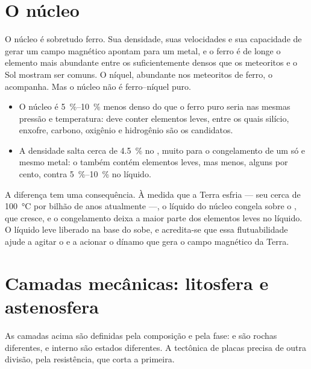 \section{O núcleo}

O núcleo é sobretudo ferro. Sua densidade, suas velocidades e sua capacidade de gerar um campo magnético apontam para um metal, e o ferro é de longe o elemento mais abundante entre os suficientemente densos que os meteoritos e o Sol mostram ser comuns. O níquel, abundante nos meteoritos de ferro, o acompanha. Mas o núcleo não é ferro--níquel puro.
\begin{itemize}
  \item O núcleo é \qtyrange{5}{10}{\percent} menos denso do que o ferro puro seria nas mesmas pressão e temperatura: deve conter elementos leves, entre os quais silício, enxofre, carbono, oxigênio e hidrogênio são os candidatos.
  \item A densidade salta cerca de \qty{4.5}{\percent} no , muito para o congelamento de um só e mesmo metal: o  também contém elementos leves, mas menos, alguns por cento, contra \qtyrange{5}{10}{\percent} no líquido.
\end{itemize}
A diferença tem uma consequência. À medida que a Terra esfria --- seu  cerca de \qty{100}{\degreeCelsius} por bilhão de anos atualmente ---, o líquido do núcleo congela sobre o , que cresce, e
o congelamento deixa a maior parte dos elementos leves no líquido. O líquido leve liberado na base do  sobe, e acredita-se que essa flutuabilidade ajude a agitar o  e a acionar o dínamo que gera o campo magnético da Terra.

\section{Camadas mecânicas: litosfera e astenosfera}

As camadas acima são definidas pela composição e pela fase:  e  são rochas diferentes,  e interno são estados diferentes. A tectônica de placas precisa de outra divisão, pela resistência, que corta a primeira.

